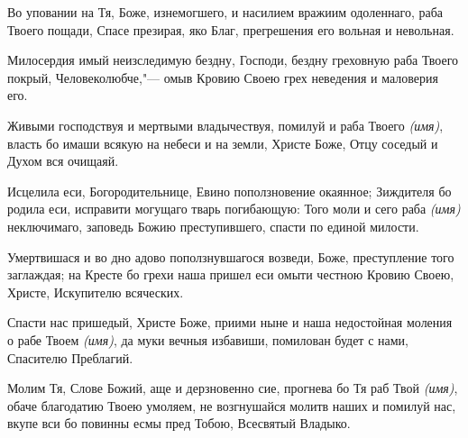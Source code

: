 \begin{mymulticols}





Во уповании на Тя, Боже, изнемогшего, и насилием вражиим одоленнаго, раба Твоего пощади, Спасе презирая, яко Благ, прегрешения его вольная и невольная.




Милосердия имый неизследимую бездну, Господи, бездну греховную раба Твоего покрый, Человеколюбче,"--- омыв Кровию Своею грех неведения и маловерия его.


\slava


Живыми господствуя и мертвыми владычествуя, помилуй и раба Твоего {\itshape (имя)}, власть бо имаши всякую на небеси и на земли, Христе Боже, Отцу соседый и Духом вся очищаяй.


\inyne


Исцелила еси, Богородительнице, Евино поползновение окаянное; Зиждителя бо родила еси, исправити могущаго тварь погибающую: Того моли и сего раба {\itshape (имя)} неключимаго, заповедь Божию преступившего, спасти по единой милости. 








Умертвишася и во дно адово поползнувшагося возведи, Боже, преступление того заглаждая; на Кресте бо грехи наша пришел еси омыти честною Кровию Своею, Христе, Искупителю всяческих.




Спасти нас пришедый, Христе Боже, приими ныне и наша недостойная моления о рабе Твоем {\itshape (имя)}, да муки вечныя избавиши, помилован будет с нами, Спасителю Преблагий.


\slava


Молим Тя, Слове Божий, аще и дерзновенно сие, прогнева бо Тя раб Твой {\itshape (имя)}, обаче благодатию Твоею умоляем, не возгнушайся молитв наших и помилуй нас, вкупе вси бо повинны есмы пред Тобою, Всесвятый Владыко.



\end{mymulticols}

